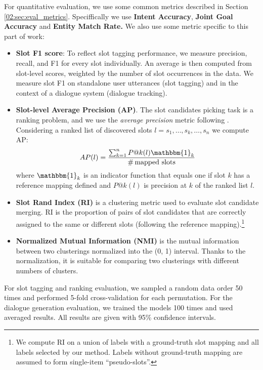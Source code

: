 For quantitative evaluation, we use some common metrics described in Section \ref{02:sec:eval_metrics}.
Speciffically we use \textbf{Intent Accuracy}, \textbf{Joint Goal Accuracy} and \textbf{Entity Match Rate.}
We also use some metric specific to this part of work:
\begin{itemize}
    \item \textbf{Slot F1 score}: To reflect slot tagging performance, we measure precision, recall, and F1 for every slot individually.
    An average is then computed from slot-level scores, weighted by the number of slot occurrences in the data.
    We measure slot F1 on standalone user utterances (slot tagging) and in the context of a dialogue system (dialogue tracking).
    \item \textbf{Slot-level Average Precision (AP)}. The slot candidates picking task is a ranking problem, and we use the \textit{average precision} metric following \citet{chen2014leveraging}.
    Considering a ranked list of discovered slots $l = s_1, \dots, s_k, \dots, s_n$ we compute AP:
    \begin{equation}
        AP(l) = \frac{\sum_{k=1}^n P@k(l)\mathbbm{1}_k}{\mbox{\#\,mapped\ slots}}
    \end{equation}
    where $\mathbbm{1}_k$ is an indicator function that equals one if slot $k$ has a reference mapping defined and $P@k(l)$ is precision at $k$ of the ranked list $l$.
    \item \textbf{Slot Rand Index (RI)} is a clustering metric used to evaluate slot candidate merging. RI is the proportion of pairs of slot candidates that are correctly assigned to the same or different slots (following the reference mapping).\footnote{We compute RI on a union of labels with a ground-truth slot mapping and all labels selected by our method. Labels without ground-truth mapping are assumed to form single-item “pseudo-slots”.}
    
    \item \textbf{Normalized Mutual Information (NMI)} is the mutual information between two clusterings normalized into the (0, 1) interval.
    Thanks to the normalization, it is suitable for comparing two clusterings with different numbers of clusters.
\end{itemize}

For slot tagging and ranking evaluation, we sampled a random data order 50 times and performed 5-fold cross-validation for each permutation.
For the dialogue generation evaluation, we trained the models 100 times and used averaged results.
All results are given with 95\% confidence intervals.

